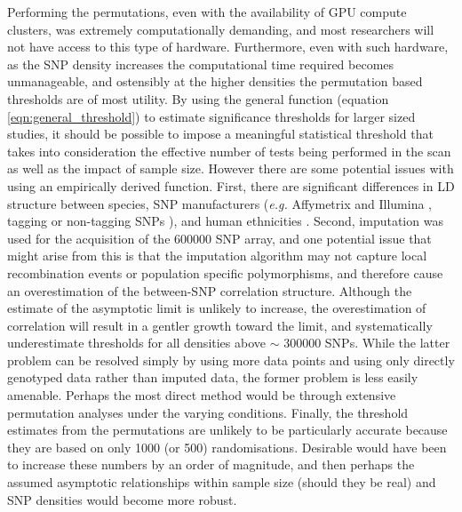 Performing the permutations, even with the availability of GPU compute clusters, was extremely computationally demanding, and most researchers will not have access to this type of hardware. Furthermore, even with such hardware, as the SNP density increases the computational time required becomes unmanageable, and ostensibly at the higher densities the permutation based thresholds are of most utility. By using the general function (equation \ref{eqn:general_threshold}) to estimate significance thresholds for larger sized studies, it should be possible to impose a meaningful statistical threshold that takes into consideration the effective number of tests being performed in the scan as well as the impact of sample size. However there are some potential issues with using an empirically derived function. First, there are significant differences in LD structure between species, SNP manufacturers (\emph{e.g.} Affymetrix and Illumina \citep{Gao2010, Becker2011}, tagging or non-tagging SNPs \citep{Stram2004, Halperin2005}), and human ethnicities \citep{TheInternationalHapmapConsortium2005}. Second, imputation was used for the acquisition of the 600000 SNP array, and one potential issue that might arise from this is that the imputation algorithm may not capture local recombination events or population specific polymorphisms, and therefore cause an overestimation of the between-SNP correlation structure. Although the estimate of the asymptotic limit is unlikely to increase, the overestimation of correlation will result in a gentler growth toward the limit, and systematically underestimate thresholds for all densities above $\sim$ 300000 SNPs. While the latter problem can be resolved simply by using more data points and using only directly genotyped data rather than imputed data, the former problem is less easily amenable. Perhaps the most direct method would be through extensive permutation analyses under the varying conditions. Finally, the threshold estimates from the permutations are unlikely to be particularly accurate because they are based on only 1000 (or 500) randomisations. Desirable would have been to increase these numbers by an order of magnitude, and then perhaps the assumed asymptotic relationships within sample size (should they be real) and SNP densities would become more robust.

